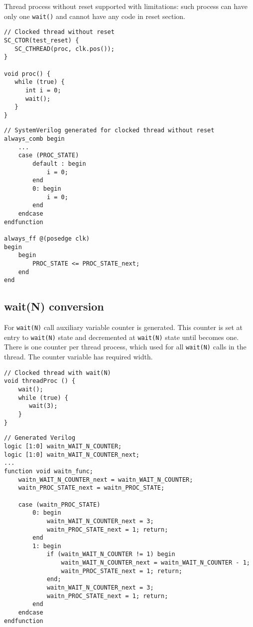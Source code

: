 Thread process without reset supported with limitations: such process can have only one {\tt wait()} and cannot have any code in reset section.

\begin{lstlisting}[style=mycpp]
// Clocked thread without reset
SC_CTOR(test_reset) {
   SC_CTHREAD(proc, clk.pos());
}

void proc() {
   while (true) {
      int i = 0;
      wait();
   }
}
\end{lstlisting}
%
\begin{lstlisting}[style=myverilog]
// SystemVerilog generated for clocked thread without reset
always_comb begin 
    ...
    case (PROC_STATE)
        default : begin
            i = 0;
        end
        0: begin
            i = 0;
        end
    endcase
endfunction

always_ff @(posedge clk) 
begin 
    begin
        PROC_STATE <= PROC_STATE_next;
    end
end
\end{lstlisting}

\subsection{wait(N) conversion}\label{section:waitn_gen}

For {\tt wait(N)} call auxiliary variable counter is generated. This counter is set at entry to {\tt wait(N)} state and decremented at {\tt wait(N)} state until becomes one.
There is one counter per thread process, which used for all {\tt wait(N)} calls in the thread. The counter variable has required width.

\begin{lstlisting}[style=mycpp]
// Clocked thread with wait(N)
void threadProc () {
    wait();
    while (true) {
       wait(3);
    }
}
\end{lstlisting}
%
\begin{lstlisting}[style=myverilog]
// Generated Verilog
logic [1:0] waitn_WAIT_N_COUNTER;
logic [1:0] waitn_WAIT_N_COUNTER_next;
...
function void waitn_func;
    waitn_WAIT_N_COUNTER_next = waitn_WAIT_N_COUNTER;
    waitn_PROC_STATE_next = waitn_PROC_STATE;
    
    case (waitn_PROC_STATE)
        0: begin
            waitn_WAIT_N_COUNTER_next = 3;
            waitn_PROC_STATE_next = 1; return;    
        end
        1: begin
            if (waitn_WAIT_N_COUNTER != 1) begin
                waitn_WAIT_N_COUNTER_next = waitn_WAIT_N_COUNTER - 1;
                waitn_PROC_STATE_next = 1; return;    
            end;
            waitn_WAIT_N_COUNTER_next = 3;
            waitn_PROC_STATE_next = 1; return;    
        end
    endcase
endfunction
\end{lstlisting}

